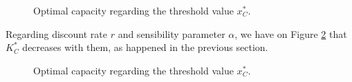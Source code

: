 \begin{figure}[!htb]
	\begin{subfigmatrix}{2}
	\end{subfigmatrix}
	\caption{Optimal capacity regarding the threshold value $x^*_C$.}
	\label{fig:2_k3}
\end{figure}

Regarding discount rate $r$ and sensibility parameter $\alpha$, we have on Figure \ref{fig:2_k2} that $K^*_C$ decreases with them, as happened in the previous section.

\begin{figure}[!htb]
	\begin{subfigmatrix}{2}
	\end{subfigmatrix}
	\caption{Optimal capacity regarding the threshold value $x^*_C$.}
	\label{fig:2_k2}
\end{figure}